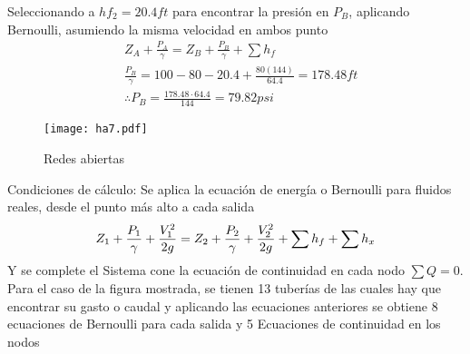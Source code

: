 Seleccionando a $hf_2= 20.4ft$ para encontrar la presión en $P_B$, aplicando Bernoulli, asumiendo la misma velocidad en ambos punto
\begin{align*}
    &Z_A + \frac{P_A}{\gamma} = Z_B +\frac{P_B}{\gamma} + \sum h_f\\
    &\frac{P_B}{\gamma} = 100 - 80 - 20.4 + \frac{80(144)}{64.4} = 178.48ft\\
    &\therefore P_B = \frac{178.48\cdot 64.4}{144} = 79.82psi
\end{align*}
\begin{figure}[h!]
\centering
  \texttt{[image: ha7.pdf]}
  \caption{Redes abiertas}
  \label{ha7}
\end{figure}
Condiciones de cálculo: Se aplica la ecuación de energía o Bernoulli para fluidos reales, desde el punto más alto a cada salida
\begin{equation}
    Z_1 + \frac{P_1}{\gamma} + \frac{V_1^2}{2g} = Z_2 + \frac{P_2}{\gamma} + \frac{V_2^2}{2g} + \sum h_f + \sum h_x\\
\end{equation}
Y se complete el Sistema cone la ecuación de continuidad en cada nodo $\sum Q=0$.
Para el caso de la figura mostrada, se tienen 13 tuberías de las cuales hay que encontrar su gasto o caudal y aplicando las ecuaciones anteriores se obtiene 8 ecuaciones de Bernoulli para cada salida y 5 Ecuaciones de continuidad en los nodos
